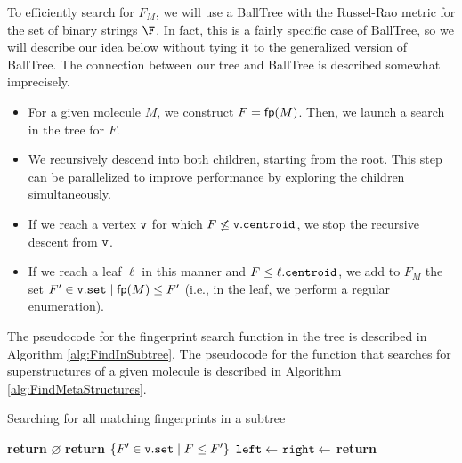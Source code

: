 To efficiently search for $F_M$, we will use a BallTree with the Russel-Rao metric for the set of binary strings $\F$. 
In fact, this is a fairly specific case of BallTree, so we will describe our idea below without tying it to the 
generalized version of BallTree. The connection between our tree and BallTree is described somewhat imprecisely.

\begin{itemize}
\item For a given molecule $M$, we construct $F = {\sf fp}(M)$. Then, we launch a search in the tree for $F$.
\item We recursively descend into both children, starting from the root. This step can be parallelized to improve 
performance by exploring the children simultaneously.
\item If we reach a vertex ${\tt v}$ for which $F \not\le {\tt v.centroid}$, we stop the recursive descent 
from ${\tt v}$.
\item If we reach a leaf $\ell$ in this manner and $F \le \ell.{\tt centroid}$, we add to $F_M$ the 
set ${F' \in {\tt v.set} \mid {\sf fp}(M) \le F'}$ (i.e., in the leaf, we perform a regular enumeration).
\end{itemize}

The pseudocode for the fingerprint search function in the tree is described in Algorithm \ref{alg:FindInSubtree}. 
The pseudocode for the function that searches for superstructures of a given molecule is described in 
Algorithm \ref{alg:FindMetaStructures}.

\begin{algorithm}
  \caption{Searching for all matching fingerprints in a subtree}\label{alg:FindInSubtree}
  \begin{algorithmic}[1]
     \label{alg:FindInSubtree:line:RecursionCut}
      \State \textbf{return} $\varnothing$
      \State \textbf{return} $\{F' \in {\tt v.set} \mid F \le F' \}$ 
    \Else
      \State ${\tt left} \gets $   
      \State ${\tt right} \gets $  
      \State \textbf{return}  
    \EndIf
    \EndProcedure
  \end{algorithmic}
\end{algorithm}


